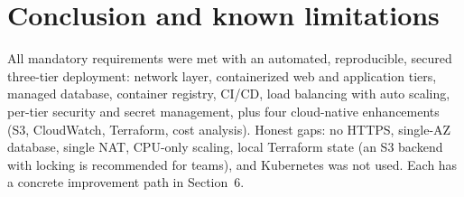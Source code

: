 \documentclass[10pt,a4paper]{article}
\begin{document}
\section{Conclusion and known limitations}
All mandatory requirements were met with an automated, reproducible, secured three-tier deployment: network layer, containerized web and
application tiers, managed database, container registry, CI/CD, load balancing with auto scaling, per-tier security and secret management, plus
four cloud-native enhancements (S3, CloudWatch, Terraform, cost analysis). Honest gaps: no HTTPS, single-AZ database, single NAT, CPU-only scaling,
local Terraform state (an S3 backend with locking is recommended for teams), and Kubernetes was not used. Each has a concrete improvement path in Section~6.
\end{document}
